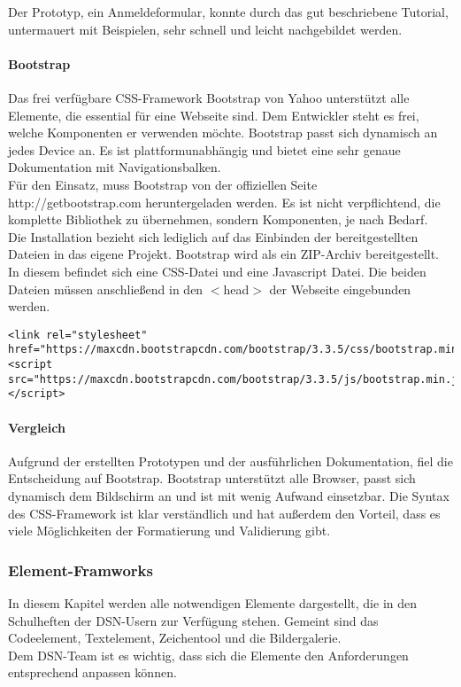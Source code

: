 Der Prototyp, ein Anmeldeformular, konnte durch das gut beschriebene Tutorial, untermauert mit Beispielen, sehr schnell und leicht nachgebildet werden.

\paragraph{Bootstrap}
Das frei verfügbare CSS-Framework Bootstrap von Yahoo unterstützt alle Elemente, die essential für eine Webseite sind. Dem Entwickler steht es frei, welche Komponenten er verwenden möchte. Bootstrap passt sich dynamisch an jedes Device an. Es ist plattformunabhängig und bietet eine sehr genaue Dokumentation mit Navigationsbalken.\\

Für den Einsatz, muss Bootstrap von der offiziellen Seite http://getbootstrap.com heruntergeladen werden. Es ist nicht verpflichtend, die komplette Bibliothek zu übernehmen, sondern Komponenten, je nach Bedarf.\\
 
Die Installation bezieht sich lediglich auf das Einbinden der bereitgestellten Dateien in das eigene Projekt. Bootstrap wird als ein ZIP-Archiv bereitgestellt. In diesem befindet sich eine CSS-Datei und eine Javascript Datei. Die beiden Dateien müssen anschließend in den $<$head$>$ der Webseite eingebunden werden. \cite{BOOTSTRAP}
\begin{lstlisting}[caption={Bootstrap einbinden \cite{BOOTSTRAP}}]
<link rel="stylesheet"
href="https://maxcdn.bootstrapcdn.com/bootstrap/3.3.5/css/bootstrap.min.css">
<script src="https://maxcdn.bootstrapcdn.com/bootstrap/3.3.5/js/bootstrap.min.js">
</script>
\end{lstlisting}

\paragraph{Vergleich}
Aufgrund der erstellten Prototypen und der ausführlichen Dokumentation, fiel die Entscheidung auf Bootstrap. Bootstrap unterstützt alle Browser, passt sich dynamisch dem Bildschirm an und ist mit wenig Aufwand einsetzbar. Die Syntax des CSS-Framework ist klar verständlich und hat außerdem den Vorteil, dass es viele Möglichkeiten der Formatierung und Validierung gibt.

\subsubsection{Element-Framworks}
In diesem Kapitel werden alle notwendigen Elemente dargestellt, die in den Schulheften der DSN-Usern zur Verfügung stehen. Gemeint sind das Codeelement, Textelement, Zeichentool und die Bildergalerie.\\
Dem DSN-Team ist es wichtig, dass sich die Elemente den Anforderungen entsprechend anpassen können.

